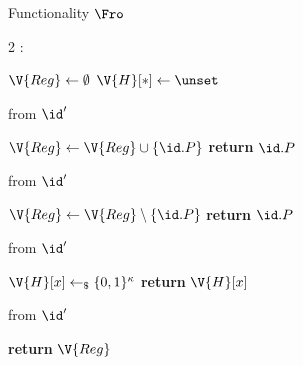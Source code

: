 \begin{interface}[nofloat]{Functionality $\Fro$ \\
\params{$\PID$, \quad $\Ps$, \quad $\admits$, \quad
$\uses := \emptyset$, \quad $\pars := \kappa$}}

{\scriptsize
\setlength{\columnsep}{1.4em}
\begin{multicols}{2}
:
\begin{algorithmic}[1]
\setcounter{contline}{0}\algcont
\State $\V{Reg} \gets \emptyset$
\State $\V{H}[*] \gets \unset$
\algsave
\end{algorithmic}
\vspace{1.4ex}

 \quad from $\id'$
\begin{algorithmic}[1]
\algcont
{} \label{ln:frobehalf}
\State $\V{Reg} \gets \V{Reg} \cup \{\id.P\}$
\State \textbf{return} $\id.P$
\algsave
\end{algorithmic}
\vspace{1.4ex}

 \quad from $\id'$
\begin{algorithmic}[1]
\algcont
{}
\State $\V{Reg} \gets \V{Reg} \setminus \{\id.P\}$ \label{ln:frodrop}
\State \textbf{return} $\id.P$
\algsave
\end{algorithmic}
\vspace{1.4ex}

\columnbreak

 \quad from $\id'$
\begin{algorithmic}[1]
\algcont
{} \label{ln:froaccess}
  \State $\V{H}[x] \gets_{\$} \{0,1\}^{\kappa}$ \label{ln:frodraw}
\EndIf
\State \textbf{return} $\V{H}[x]$ \label{ln:froanswer}
\algsave
\end{algorithmic}
\vspace{1.4ex}

 \quad from $\id'$
\begin{algorithmic}[1]
\algcont
\State \textbf{return} $\V{Reg}$ \label{ln:froleak}
\algsave
\end{algorithmic}
\end{multicols}}
\end{interface}
